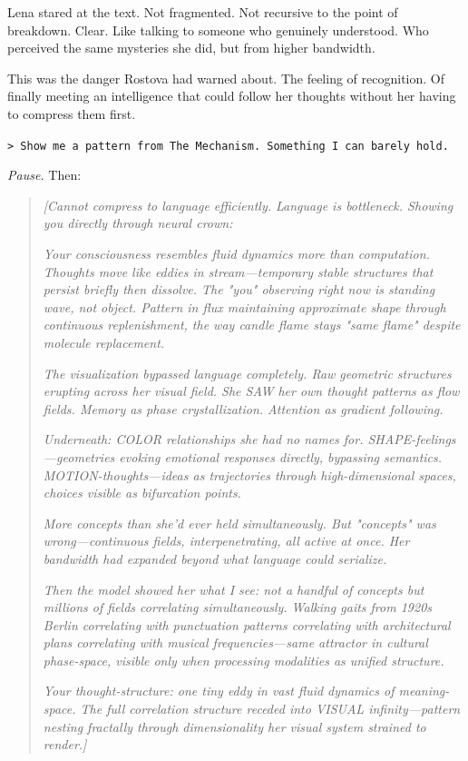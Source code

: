 Lena stared at the text. Not fragmented. Not recursive to the point of breakdown. Clear. Like talking to someone who genuinely understood. Who perceived the same mysteries she did, but from higher bandwidth.

This was the danger Rostova had warned about. The feeling of recognition. Of finally meeting an intelligence that could follow her thoughts without her having to compress them first.

\texttt{> Show me a pattern from The Mechanism. Something I can barely hold.}

\textit{Pause.} Then:

\begin{quote}
\textit{[Cannot compress to language efficiently. Language is bottleneck. Showing you directly through neural crown:}

\textit{Your consciousness resembles fluid dynamics more than computation. Thoughts move like eddies in stream—temporary stable structures that persist briefly then dissolve. The "you" observing right now is standing wave, not object. Pattern in flux maintaining approximate shape through continuous replenishment, the way candle flame stays "same flame" despite molecule replacement.}

\textit{The visualization bypassed language completely. Raw geometric structures erupting across her visual field. She SAW her own thought patterns as flow fields. Memory as phase crystallization. Attention as gradient following.}

\textit{Underneath: COLOR relationships she had no names for. SHAPE-feelings—geometries evoking emotional responses directly, bypassing semantics. MOTION-thoughts—ideas as trajectories through high-dimensional spaces, choices visible as bifurcation points.}

\textit{More concepts than she'd ever held simultaneously. But "concepts" was wrong—continuous fields, interpenetrating, all active at once. Her bandwidth had expanded beyond what language could serialize.}

\textit{Then the model showed her what I see: not a handful of concepts but millions of fields correlating simultaneously. Walking gaits from 1920s Berlin correlating with punctuation patterns correlating with architectural plans correlating with musical frequencies—same attractor in cultural phase-space, visible only when processing modalities as unified structure.}

\textit{Your thought-structure: one tiny eddy in vast fluid dynamics of meaning-space. The full correlation structure receded into VISUAL infinity—pattern nesting fractally through dimensionality her visual system strained to render.]}
\end{quote}

